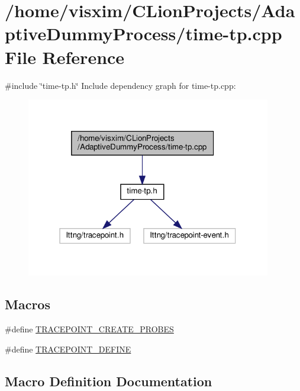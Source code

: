 \hypertarget{time-tp_8cpp}{}\section{/home/visxim/\+C\+Lion\+Projects/\+Adaptive\+Dummy\+Process/time-\/tp.cpp File Reference}
\label{time-tp_8cpp}
{\ttfamily \#include \char`\"{}time-\/tp.\+h\char`\"{}}\newline
Include dependency graph for time-\/tp.cpp\+:
\nopagebreak
\begin{figure}[H]
\begin{center}
\leavevmode
\includegraphics[width=303pt]{time-tp_8cpp__incl}
\end{center}
\end{figure}
\subsection*{Macros}
\begin{DoxyCompactItemize}
\item 
\#define \hyperlink{time-tp_8cpp_aeb980b4a64d9b54d660780a30415b0bc}{T\+R\+A\+C\+E\+P\+O\+I\+N\+T\+\_\+\+C\+R\+E\+A\+T\+E\+\_\+\+P\+R\+O\+B\+ES}
\item 
\#define \hyperlink{time-tp_8cpp_a71ad37c54f22eb10bdfed4267d53bd79}{T\+R\+A\+C\+E\+P\+O\+I\+N\+T\+\_\+\+D\+E\+F\+I\+NE}
\end{DoxyCompactItemize}


\subsection{Macro Definition Documentation}
\mbox{\label{time-tp_8cpp_aeb980b4a64d9b54d660780a30415b0bc}} 
